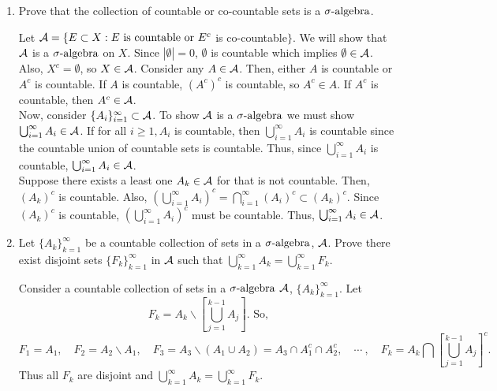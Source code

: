 \begin{enumerate}
\item Prove that the collection of countable or co-countable sets is a ${\sigma}\text{-algebra}$.

\begin{pf}
 Let ${\mathcal A} = \{E \subset X : E \text{ is countable or } E^c $ is co-countable$\}$. We will show that ${\mathcal A}$ is a ${\sigma}\text{-algebra}$ on $X$. Since $|\emptyset|=0$, $\emptyset$ is countable which implies $\emptyset \in {\mathcal A}$. Also, $X^c = \emptyset$, so $X \in {\mathcal A}$. Consider any $A \in {\mathcal A}$. Then, either $A$ is countable or $A^c$ is countable. If $A$ is countable, $(A^c)^c$ is countable, so $A^c \in A$. If $A^c$ is countable, then $A^c \in {\mathcal A}$. \\
 Now, consider $\{A_i\}_{i=1}^\infty \subset {\mathcal A}$. To show ${\mathcal A}$ is a ${\sigma}\text{-algebra}$ we must show $\bigcup_{i=1}^\infty A_i \in {\mathcal A}$. If for all $i \geq 1, A_i$ is countable, then $\bigcup_{i=1}^\infty A_i$ is countable since the countable union of countable sets is countable. Thus, since $\bigcup_{i=1}^\infty A_i$ is countable, $\bigcup_{i=1}^\infty A_i \in {\mathcal A}$. \\
 Suppose there exists a least one $A_k \in {\mathcal A}$ for that is not countable. Then, $(A_k)^c$ is countable. Also, $\left(\bigcup_{i=1}^\infty A_i\right)^c = \bigcap_{i=1}^\infty (A_i)^c \subset (A_k)^c$. Since $(A_k)^c$ is countable, $\left(\bigcup_{i=1}^\infty A_i\right)^c$ must be countable. Thus, $\bigcup_{i=1}^\infty A_i \in {\mathcal A}$. 
 
\end{pf}

\item Let $\{ A_k \}_{k=1}^\infty$ be a countable collection of sets in a ${\sigma}\text{-algebra}$, ${\mathcal A}$. Prove there exist disjoint sets $\{F_k\}_{k=1}^\infty$ in ${\mathcal A}$ such that $\bigcup_{k=1}^\infty A_k = \bigcup_{k=1}^\infty F_k $.
\begin{pf}
	Consider a countable collection of sets in a ${\sigma}\text{-algebra}$ ${\mathcal A}$, $\{ A_k \}_{k=1}^\infty$. Let 
	\begin{equation*}
	F_k = A_k \backslash \left[\bigcup_{j=1}^{k-1} A_j \right]. \text{ So,}
	\end{equation*}
 \begin{equation*}
F_1 = A_1, \quad 
F_2 = A_2 \backslash A_1,\quad
F_3 = A_3 \backslash (A_1 \cup A_2) = A_3 \cap A_1^c \cap A_2^c,\quad
\cdots \ ,\quad
F_k = A_k \bigcap \left[\bigcup_{j=1}^{k-1} A_j \right]^c.
\end{equation*}
Thus all $F_k$ are disjoint and $\bigcup_{k=1}^\infty A_k = \bigcup_{k=1}^\infty F_k $.
\end{pf}



\end{enumerate}




